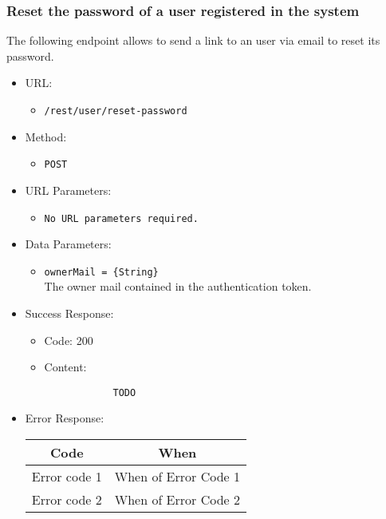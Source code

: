 \subsubsection*{Reset the password of a user registered in the system}

The following endpoint allows to send a link to an user via email to reset its password.

\begin{itemize}

    \item URL: 
    \begin{itemize}
        \item \texttt{/rest/user/reset-password}
    \end{itemize}
    
    \item Method: 
    \begin{itemize}
        \item \texttt{POST}
    \end{itemize}
    
    \item URL Parameters: 
    \begin{itemize}
        \item \texttt{No URL parameters required.} 
    \end{itemize}
    
    \item Data Parameters: 
    \begin{itemize}
        \item \texttt{ownerMail = \{String\}} \\
        The owner mail contained in the authentication token.    
    \end{itemize}
    
    \item Success Response: 
    \begin{itemize}
        \item Code: 200
        \item Content:
        \begin{lstlisting}
            TODO
        \end{lstlisting}
    \end{itemize}
    
    \item Error Response:
    \begin{table}[!h]
    \centering 
    \begin{tabular}{|c|c|}
    \hline
    \multicolumn{1}{|c|}{\textbf{Code}} & \multicolumn{1}{c|}{\textbf{When}} \\ \hline
    Error code 1 & When of Error Code 1 \\\hline
    Error code 2 & When of Error Code 2 \\\hline
    \end{tabular} 
    \end{table} 
    
\end{itemize}


